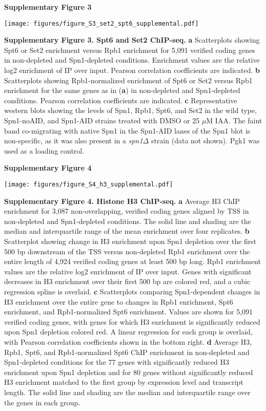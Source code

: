 \documentclass[8pt]{extarticle}
\begin{document}
\newpage

\textbf{\large Supplementary Figure 3}

{\texttt{[image: figures/figure\_S3\_set2\_spt6\_supplemental.pdf]}\par}

\vspace{2em}
\textbf{Supplementary Figure 3. Spt6 and Set2 ChIP-seq.}
\textbf{a} Scatterplots showing Spt6 or Set2 enrichment versus Rpb1 enrichment for 5,091 verified coding genes in non-depleted and Spn1-depleted conditions.
Enrichment values are the relative log2 enrichment of IP over input.
Pearson correlation coefficients are indicated.
\textbf{b} Scatterplots showing Rpb1-normalized enrichment of Spt6 or Set2 versus Rpb1 enrichment for the same genes as in (\textbf{a}) in non-depleted and Spn1-depleted conditions.
Pearson correlation coefficients are indicated.
\textbf{c} Representative western blots showing the levels of Spn1, Rpb1, Spt6, and Set2 in the wild type, Spn1-noAID, and Spn1-AID strains treated with DMSO or 25 $\mu$M IAA.
The faint band co-migrating with native Spn1 in the Spn1-AID lanes of the Spn1 blot is non-specific, as it was also present in a \textit{spn1$\Delta$} strain (data not shown).
Pgk1 was used as a loading control.

\newpage

\textbf{\large Supplementary Figure 4}

{\texttt{[image: figures/figure\_S4\_h3\_supplemental.pdf]}\par}

\vspace{2em}
\textbf{Supplementary Figure 4. Histone H3 ChIP-seq.}
\textbf{a} Average H3 ChIP enrichment for 3,087 non-overlapping, verified coding genes aligned by TSS in non-depleted and Spn1-depleted conditions.
The solid line and shading are the median and interquartile range of the mean enrichment over four replicates.
\textbf{b} Scatterplot showing change in H3 enrichment upon Spn1 depletion over the first 500 bp downstream of the TSS versus non-depleted Rpb1 enrichment over the entire length of 4,924 verified coding genes at least 500 bp long.
Rpb1 enrichment values are the relative log2 enrichment of IP over input.
Genes with significant decreases in H3 enrichment over their first 500 bp are colored red, and a cubic regression spline is overlaid.
\textbf{c} Scatterplots comparing Spn1-dependent changes in H3 enrichment over the entire gene to changes in Rpb1 enrichment, Spt6 enrichment, and Rpb1-normalized Spt6 enrichment.
Values are shown for 5,091 verified coding genes, with genes for which H3 enrichment is significantly reduced upon Spn1 depletion colored red.
A linear regression for each group is overlaid, with Pearson correlation coefficients shown in the bottom right.
\textbf{d} Average H3, Rpb1, Spt6, and Rpb1-normalized Spt6 ChIP enrichment in non-depleted and Spn1-depleted conditions for the 77 genes with significantly reduced H3 enrichment upon Spn1 depletion and for 80 genes without significantly reduced H3 enrichment matched to the first group by expression level and transcript length.
The solid line and shading are the median and interquartile range over the genes in each group.
\end{document}
